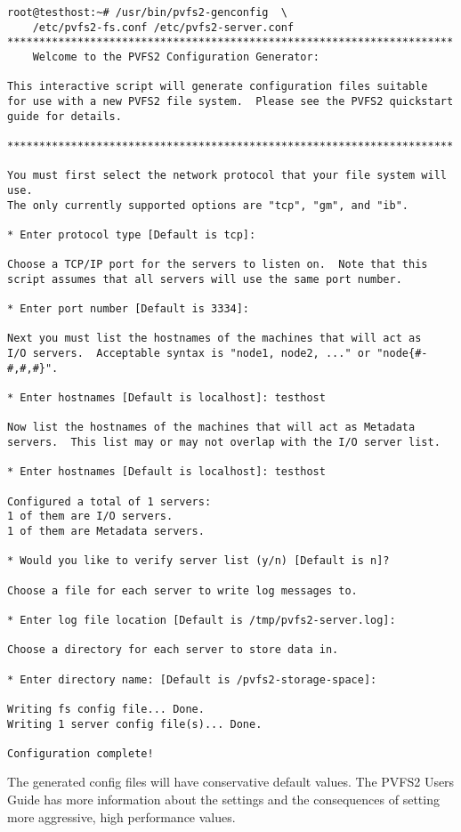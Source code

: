 \documentclass[11pt, letterpaper]{article}
\begin{document}
\begin{verbatim}
root@testhost:~# /usr/bin/pvfs2-genconfig  \
	/etc/pvfs2-fs.conf /etc/pvfs2-server.conf
**********************************************************************
	Welcome to the PVFS2 Configuration Generator:

This interactive script will generate configuration files suitable
for use with a new PVFS2 file system.  Please see the PVFS2 quickstart
guide for details.

**********************************************************************

You must first select the network protocol that your file system will use.
The only currently supported options are "tcp", "gm", and "ib".

* Enter protocol type [Default is tcp]: 

Choose a TCP/IP port for the servers to listen on.  Note that this
script assumes that all servers will use the same port number.

* Enter port number [Default is 3334]: 

Next you must list the hostnames of the machines that will act as
I/O servers.  Acceptable syntax is "node1, node2, ..." or "node{#-#,#,#}".

* Enter hostnames [Default is localhost]: testhost

Now list the hostnames of the machines that will act as Metadata
servers.  This list may or may not overlap with the I/O server list.

* Enter hostnames [Default is localhost]: testhost

Configured a total of 1 servers:
1 of them are I/O servers.
1 of them are Metadata servers.

* Would you like to verify server list (y/n) [Default is n]? 

Choose a file for each server to write log messages to.

* Enter log file location [Default is /tmp/pvfs2-server.log]: 

Choose a directory for each server to store data in.

* Enter directory name: [Default is /pvfs2-storage-space]: 

Writing fs config file... Done.
Writing 1 server config file(s)... Done.

Configuration complete!
\end{verbatim}

The generated config files will have conservative default values.  The PVFS2
Users Guide has more information about the settings and the consequences of
setting more aggressive, high performance values.
\end{document}
